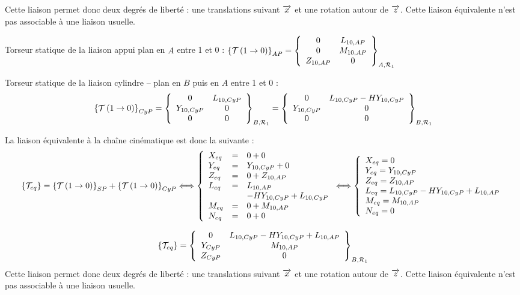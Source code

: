 \documentclass[10pt]{article}
\begin{document}
Cette liaison permet donc deux degrés de liberté : une translations suivant $\vect{x}$ et une rotation autour de $\vect{z}$. Cette liaison équivalente n'est pas associable à une liaison usuelle. 


\noindent\colorbox{grisf}{}

Torseur statique de la liaison appui plan en $A$ entre 1 et 0 : 
$\torseurstat{T}{1}{0}_{AP}=\torseurcol{0}{0}{Z_{10,AP}}{L_{10,AP}}{M_{10,AP}}{0}{A,\mathcal{R}_1}$

Torseur statique de la liaison cylindre -- plan en $B$ puis en $A$ entre 1 et 0 :
$$
\torseurstat{T}{1}{0}_{CyP}
=\torseurcol{0}{Y_{10,CyP}}{0}{L_{10,CyP}}{0}{0}{B,\mathcal{R}_1}
=\torseurcol{0}{Y_{10,CyP}}{0}{L_{10,CyP}-HY_{10,CyP}}{0}{0}{B,\mathcal{R}_1}
$$

La liaison équivalente à la chaîne cinématique est donc la suivante : 
$$\{\mathcal{T}_{eq}\}=\torseurstat{T}{1}{0}_{SP}+\torseurstat{T}{1}{0}_{CyP}
\Longleftrightarrow
\left\{
\begin{array}{lll}
X_{eq}&=&0+0\\
Y_{eq}&=&Y_{10,CyP}+0\\
Z_{eq}&=&0+Z_{10,AP}\\
L_{eq}&=&L_{10,AP}\\
&&-HY_{10,CyP}+L_{10,CyP}\\
M_{eq}&=&0+M_{10,AP}\\
N_{eq}&=&0+0\\
\end{array}
\right.
\Longleftrightarrow
\left\{
\begin{array}{l}
X_{eq}=0\\
Y_{eq}=Y_{10,CyP}\\
Z_{eq}=Z_{10,AP}\\
L_{eq}=L_{10,CyP}-HY_{10,CyP}+L_{10,AP}\\
M_{eq}=M_{10,AP}\\
N_{eq}=0\\
\end{array}
\right.
$$

$$
\{\mathcal{T}_{eq}\}=
\torseurcol{0}{Y_{CyP}}{Z_{CyP}}{L_{10,CyP}-HY_{10,CyP}+L_{10,AP}}{M_{10,AP}}{0}{B,\mathcal{R}_1}
$$
Cette liaison permet donc deux degrés de liberté : une translations suivant $\vect{x}$ et une rotation autour de $\vect{z}$. Cette liaison équivalente n'est pas associable à une liaison usuelle. 
\end{document}

